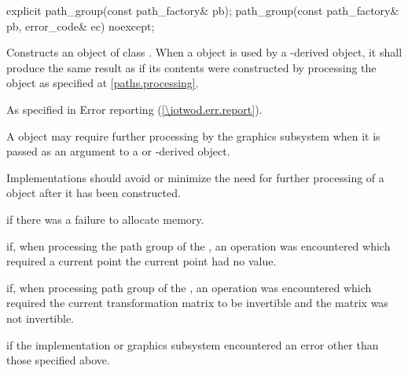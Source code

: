 \begin{itemdecl}
    explicit path_group(const path_factory& pb);
    path_group(const path_factory& pb, error_code& ec) noexcept;
\end{itemdecl}
\begin{itemdescr}
	\pnum
	\effects
	Constructs an object of class . When a  object is used by a -derived object, it shall produce the same result as if its contents were constructed by processing the  object as specified at \ref{paths.processing}.

	\pnum
	\throws
	As specified in Error reporting (\ref{\iotwod.err.report}).

	\pnum
	\remarks
	A  object may require further processing by the graphics subsystem when it is passed as an argument to a  or -derived object.
	
	\pnum
	Implementations should avoid or minimize the need for further processing of a  object after it has been constructed.

	\pnum
	\errors
	 if there was a failure to allocate memory.
	
	\pnum
	 if, when processing the path group of the , an operation was encountered which required a current point the current point had no value.
	
	\pnum
	 if, when processing path group of the , an operation was encountered which required the current transformation matrix to be invertible and the matrix was not invertible.
	
	\pnum
	 if the implementation or graphics subsystem encountered an error other than those specified above.
\end{itemdescr}
